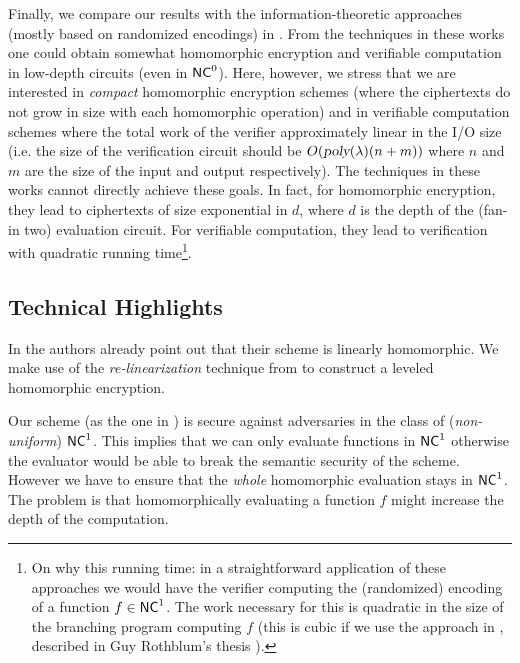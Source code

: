Finally, we compare our results with the information-theoretic approaches (mostly based on randomized encodings) in  \cite{gghkr07,re,cryptoNC0,SYY}. From the techniques in these works one could obtain somewhat homomorphic encryption and verifiable computation in low-depth circuits (even in ${\mathsf{NC}}^0$). Here, however, we stress that we are interested in \textit{compact} homomorphic encryption schemes (where the ciphertexts do not grow in size with each homomorphic operation) and in verifiable computation schemes where the total work of the verifier approximately linear in the I/O size (i.e. the size of the verification circuit should be $O({\textsl{poly}}(\lambda)(n+m))$ where $n$ and $m$ are the size of the input and output respectively). The techniques in these works cannot directly achieve these goals. In fact, for homomorphic encryption, they lead to ciphertexts of size exponential in $d$, where $d$ is the depth of the (fan-in two) evaluation circuit. For verifiable computation, they  lead to verification with quadratic running time\footnote{On why this running time: in a straightforward application of these approaches we would have the verifier computing the (randomized) encoding of a function $f \in {\ensuremath{\mathsf{NC}}}^1$. The work necessary for this is quadratic in the size of the branching program computing $f$ \cite{re} (this is  cubic if we use the approach in \cite{gghkr07}, described in Guy Rothblum's thesis \cite{rothblum2009delegating}).}. 


\subsection{Technical Highlights}

In \cite{fgcrypto} the authors already point out that their scheme is 
linearly homomorphic. We make use of the {\em re-linearization} technique 
from \cite{fhe-lwe} to construct a leveled homomorphic encryption. 

Our scheme (as the one in \cite{fgcrypto}) is secure against adversaries in the class of (\textit{non-uniform}) ${\mathsf{NC}}^1$. This implies that we can only evaluate functions in ${\mathsf{NC}}^1$ otherwise the evaluator would be able to break the semantic security of the scheme.
However we have to ensure that the \textit{whole} homomorphic evaluation stays in ${\mathsf{NC}}^1$. The problem is that homomorphically evaluating a function $f$ might 
increase the depth of the computation. 

